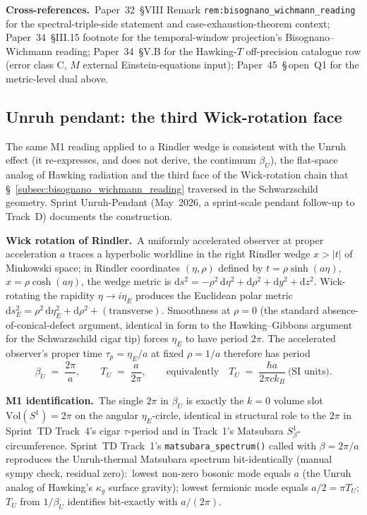 \documentclass[11pt]{article}
\begin{document}
\textbf{Cross-references.}\ Paper~32~§VIII Remark
\texttt{rem:bisognano\_wichmann\_reading} for the spectral-triple-side
statement and case-exhaustion-theorem context; Paper~34~§III.15
footnote for the temporal-window projection's Bisognano--Wichmann
reading; Paper~34~§V.B for the Hawking-$T$ off-precision catalogue row
(error class C, $M$ external Einstein-equations input);
Paper~45~§\,open~Q1 for the metric-level dual above.

\subsection{Unruh pendant: the third Wick-rotation face}
\label{subsec:unruh_pendant}

The same M1 reading applied to a Rindler wedge is consistent with the
Unruh effect (it re-expresses, and does not derive, the continuum
$\beta_U$), the flat-space analog of Hawking radiation and the third face
of the Wick-rotation chain that
\S~\ref{subsec:bisognano_wichmann_reading} traversed in the
Schwarzschild geometry.  Sprint Unruh-Pendant
(May~2026, a sprint-scale
pendant follow-up to Track~D) documents the construction.

\textbf{Wick rotation of Rindler.}\ A uniformly accelerated observer
at proper acceleration $a$ traces a hyperbolic worldline in the right
Rindler wedge $x > |t|$ of Minkowski space; in Rindler coordinates
$(\eta, \rho)$ defined by $t = \rho \sinh(a\eta)$, $x = \rho
\cosh(a\eta)$, the wedge metric is
$\mathrm{d}s^2 = -\rho^2\, \mathrm{d}\eta^2 + \mathrm{d}\rho^2 +
\mathrm{d}y^2 + \mathrm{d}z^2$.  Wick-rotating the rapidity $\eta \to
i \eta_E$ produces the Euclidean polar metric
$\mathrm{d}s^2_E = \rho^2\, \mathrm{d}\eta_E^2 + \mathrm{d}\rho^2 +
(\text{transverse})$.  Smoothness at $\rho = 0$ (the standard
absence-of-conical-defect argument, identical in form to the
Hawking--Gibbons argument for the Schwarzschild cigar tip) forces
$\eta_E$ to have period $2\pi$.  The accelerated observer's proper
time $\tau_p = \eta_E / a$ at fixed $\rho = 1/a$ therefore has period
\[
  \beta_U \;=\; \frac{2\pi}{a},
  \qquad
  T_U \;=\; \frac{a}{2\pi},
  \qquad
  \text{equivalently}
  \quad
  T_U \;=\; \frac{\hbar a}{2\pi c k_B}\ \text{(SI units)}.
\]

\textbf{M1 identification.}\ The single $2\pi$ in $\beta_U$ is exactly
the $k = 0$ volume slot $\mathrm{Vol}(S^1) = 2\pi$ on the angular
$\eta_E$-circle, identical in structural role to the $2\pi$ in
Sprint~TD Track~4's cigar $\tau$-period and in Track~1's Matsubara
$S^1_\beta$-circumference.  Sprint~TD Track~1's
\texttt{matsubara\_spectrum()} called with $\beta = 2\pi/a$ reproduces
the Unruh-thermal Matsubara spectrum bit-identically (manual sympy
check, residual zero):\ lowest non-zero bosonic mode equals $a$ (the
Unruh analog of Hawking's $\kappa_g$ surface gravity); lowest
fermionic mode equals $a/2 = \pi T_U$; $T_U$ from $1/\beta_U$
identifies bit-exactly with $a/(2\pi)$.
\end{document}
